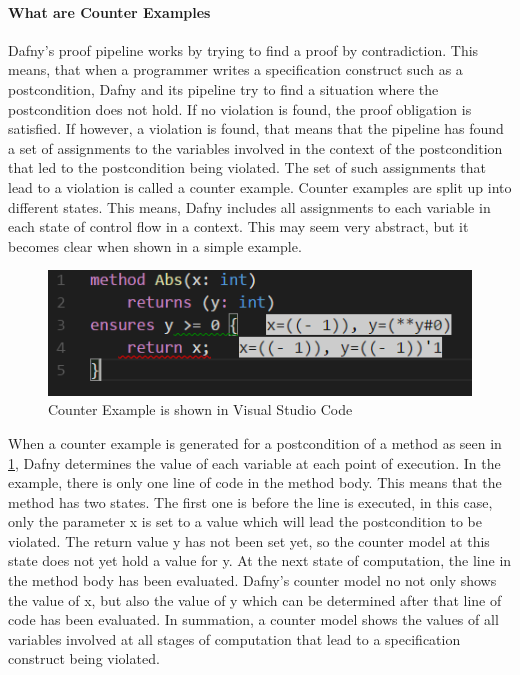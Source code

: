 \paragraph{What are Counter Examples}
Dafny's proof pipeline works by trying to find a proof by contradiction. This means, that when a programmer writes a specification construct such as a postcondition, Dafny and its pipeline try to find a situation where the postcondition does not hold. If no violation is found, the proof obligation is satisfied. \newline
If however, a violation is found, that means that the pipeline has found a set of assignments to the variables involved in the context of the postcondition that led to the postcondition being violated. The set of such assignments that lead to a violation is called a counter example. \newline
Counter examples are split up into different states. This means, Dafny includes all assignments to each variable in each state of control flow in a context. This may seem very abstract, but it becomes clear when shown in a simple example. \newline
\begin{figure}[H]
	\centering
	\includegraphics[width=1\textwidth]{img/counterModel}
	\caption{Counter Example is shown in Visual Studio Code}
	\label{fig:dfcounterModel}
\end{figure}
When a counter example is generated for a postcondition of a method as seen in \ref{fig:dfcounterModel}, Dafny determines the value of each variable at each point of execution. In the example, there is only one line of code in the method body. This means that the method has two states. The first one is before the line is executed, in this case, only the parameter x is set to a value which will lead the postcondition to be violated. The return value y has not been set yet, so the counter model at this state does not yet hold a value for y. \newline
At the next state of computation, the line in the method body has been evaluated. Dafny's counter model no not only shows the value of x, but also the value of y which can be determined after that line of code has been evaluated. \newline
In summation, a counter model shows the values of all variables involved at all stages of computation that lead to a specification construct being violated. 
